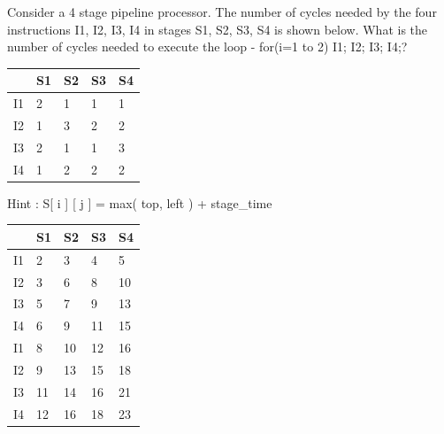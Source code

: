 \begin{enumerate}
\begin{minipage}{\linewidth}
    \item Consider a 4 stage pipeline processor.   The number of cycles needed by the four
             instructions I1, I2, I3, I4 in stages S1, S2, S3, S4 is shown below. What is the number of cycles needed to execute the loop - for(i=1 to 2) {I1; I2; I3; I4;}?

             \begin{myTableStyle} \begin{tabular}{ |m{1cm}|m{1cm}|m{1cm}|m{1cm}|m{1cm}| } \hline
                   & S1 & S2 & S3 & S4 \\ \hline
                I1 & 2  & 1  & 1  & 1  \\ \hline
                I2 & 1  & 3  & 2  & 2  \\ \hline
                I3 & 2  & 1  & 1  & 3  \\ \hline
                I4 & 1  & 2  & 2  & 2  \\ \hline
              \end{tabular} \end{myTableStyle} \vspace{0.08in}

    Hint : \quad S[ i ] [ j ] = max( top, left ) + stage\_time \\

   \begin{myTableStyle} \begin{tabular}{ |m{1cm}|m{1cm}|m{1cm}|m{1cm}|m{1cm}| } \hline
                   & S1 & S2 & S3  & S4 \\ \hline
                I1 & 2  & 3  & 4   & 5  \\ \hline
                I2 & 3  & 6  & 8   & 10  \\ \hline
                I3 & 5  & 7  & 9   & 13  \\ \hline
                I4 & 6  & 9  & 11  & 15  \\ \hline
                I1 & 8  & 10 & 12  & 16  \\ \hline
                I2 & 9  & 13 & 15  & 18  \\ \hline
                I3 & 11 & 14 & 16  & 21  \\ \hline
                I4 & 12 & 16 & 18  & 23  \\ \hline
              \end{tabular} \end{myTableStyle} \vspace{0.08in}

    \end{minipage}


\end{enumerate}
